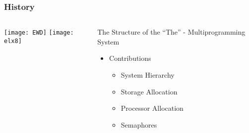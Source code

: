 \begin{frame}[plain]
	\frametitle{History}
	
	
	
	\begin{columns}
		
		\begin{column}{.4\textwidth}
			\centering
			\texttt{[image: EWD]}
			\texttt{[image: elx8]}
			
			
			
		\end{column}
		
		\begin{column}{.6\textwidth}
			
			The Structure of the “The” - Multiprogramming System
			\begin{itemize}
				\item Contributions
				\begin{itemize}
					\item System Hierarchy					
					\item Storage Allocation
					\item Processor Allocation

					\item Semaphores
					
				\end{itemize}
				
			\end{itemize}	
			
		\end{column}
		
		
	\end{columns}
	
	
\end{frame}



